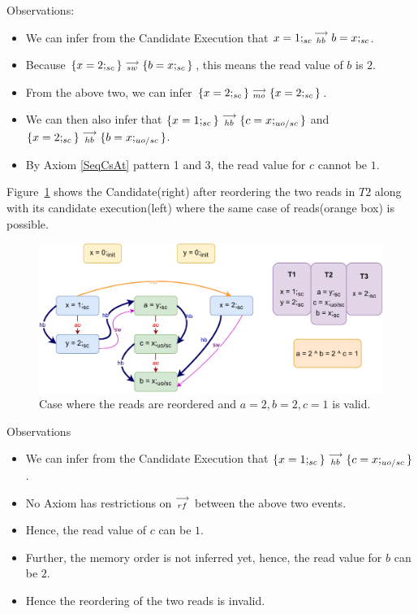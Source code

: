        Observations:
        \begin{itemize}
            \item We can infer from the Candidate Execution that $x=1;_{sc}\stackrel{\longrightarrow}{_{hb}}b=x;_{sc}$.
            \item Because $\{x=2;_{sc}\}\stackrel{\longrightarrow}{_{sw}}\{b=x;_{sc}\}$, this means the read value of $b$ is $2$.
            \item From the above two, we can infer $\{x=2;_{sc}\}\stackrel{\longrightarrow}{_{mo}}\{x=2;_{sc}\}$.
            \item We can then also infer that $\{x=1;_{sc}\}\stackrel{\longrightarrow}{_{hb}}\{c=x;_{uo/sc}\}$ and $\{x=2;_{sc}\}\stackrel{\longrightarrow}{_{hb}}\{b=x;_{uo/sc}\}$.
            \item By Axiom \ref{SeqCsAt} pattern 1 and 3, the read value for $c$ cannot be $1$.
        \end{itemize}

        Figure~\ref{reord_counter:example1(b)} shows the Candidate(right) after reordering the two reads in $T2$ along with its candidate execution(left) where the same case of reads(orange box) is possible. 
        \begin{figure}[H]
            \centering
            \includegraphics[scale=0.7]{4.InstructionReordering/4.ValidReorderingCandidate/Example0R(Rsc-Ruo,sc).pdf}
            \caption{Case where the reads are reordered and $a = 2 , b = 2, c = 1$ is valid.}
            \label{reord_counter:example1(b)}
        \end{figure}

        Observations
        \begin{itemize}
            \item We can infer from the Candidate Execution that $\{x=1;_{sc}\}\stackrel{\longrightarrow}{_{hb}}\{c=x;_{uo/sc}\}$.
            \item No Axiom has restrictions on $\stackrel{\longrightarrow}{_{rf}}$ between the above two events.
            \item Hence, the read value of $c$ can be $1$.
            \item Further, the memory order is not inferred yet\footnotemark, hence, the read value for $b$ can be $2$.
            \item Hence the reordering of the two reads is invalid. 
        \end{itemize}

